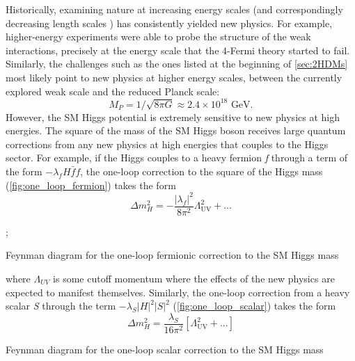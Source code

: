 Historically, examining nature at increasing energy scales (and correspondingly decreasing length scales ) has consistently yielded new physics. For example, higher-energy experiments were able to probe the structure of the weak interactions, precisely at the energy scale that the 4-Fermi theory started to fail. Similarly, the challenges such as the ones listed at the beginning of \autoref{sec:2HDMs} most likely point to new physics at higher energy scales, between the currently explored weak scale and the reduced Planck scale:
\begin{equation*}
M_P = 1/\sqrt{8\pi G} \approx 2.4\times 10^{18} \text{ GeV}.
\end{equation*}
However, the SM Higgs potential is extremely sensitive to new physics at high energies. The square of the mass of the SM Higgs boson receives large quantum corrections from any new physics at high energies that couples to the Higgs sector. For example, if the Higgs couples to a heavy fermion \emph{f} through a term of the form $-\lambda_fH\bar{f}f$, the one-loop correction to the square of the Higgs mass (\autoref{fig:one_loop_fermion}) takes the form
\begin{equation}
\Delta m_H^2 = -\frac{|\lambda_f|^2}{8\pi^2}\Lambda_\text{UV}^2 + ...
\label{eq:one_loop_fermion}
\end{equation}
\begin{marginfigure}[-1in]
  \strictpagecheck
{};
\caption{Feynman diagram for the one-loop fermionic correction to the SM Higgs mass}
\label{fig:one_loop_fermion}
\end{marginfigure}
where $\Lambda_{UV}$ is some cutoff momentum where the effects of the new physics are expected to manifest themselves. Similarly, the one-loop correction from a heavy scalar \emph{S} through the term $-\lambda_S|H|^2|S|^2$ (\autoref{fig:one_loop_scalar}) takes the form
\begin{equation}
  \Delta m_H^2 = \frac{\lambda_S}{16\pi^2}\left[\Lambda_\text{UV}^2 + ...\right]
\label{eq:one_loop_scalar}
\end{equation}
\begin{marginfigure}
\caption{Feynman diagram for the one-loop scalar correction to the SM Higgs mass}
\label{fig:one_loop_scalar}
\end{marginfigure}
